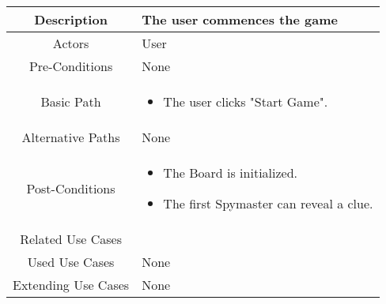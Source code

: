 \documentclass[12pt, a4paper]{article}
\begin{document}
			\begin{center}
				\begin{tabular}{ |c|p{7cm}| } 
					\hline
					Description & The user commences the game  \\
					\hline 
					Actors & User \\
					\hline  
					Pre-Conditions & None \\
					\hline  
					Basic Path & 
					
					\begin{itemize}
						
						\item The user clicks "Start Game".
					\end{itemize}\\
					\hline
					Alternative Paths & None \\
					\hline
					Post-Conditions & \begin{itemize}
						\item The Board is initialized.
						\item The first Spymaster can reveal a clue. 
					\end{itemize} \\
					\hline 
					Related Use Cases & \\
					\hline 
					Used Use Cases & None \\
					\hline 
					Extending Use Cases & None \\
					\hline 
				\end{tabular}
			\end{center}
	
	
\end{document}
